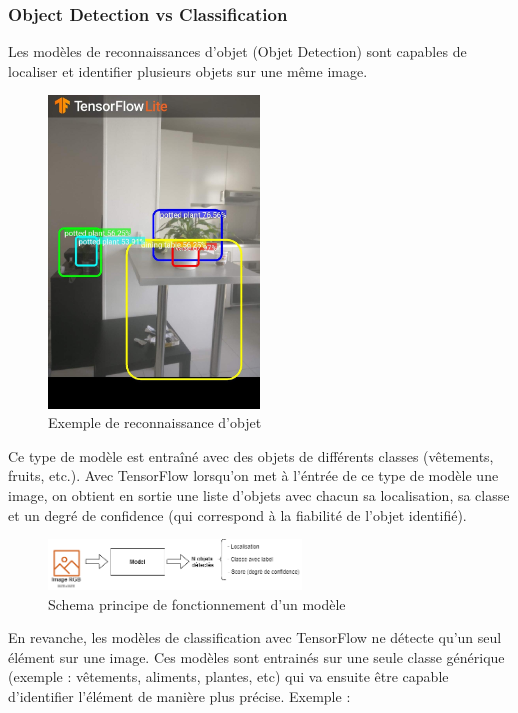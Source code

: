 \documentclass[UTF8]{EPURapport}
\begin{document}
\newpage

\subsubsection{Object Detection vs Classification}
Les modèles de reconnaissances d'objet (Objet Detection) sont capables de localiser et identifier plusieurs objets sur une même image.

\begin{figure}[h!]
\centering
  \includegraphics[width=0.5\textwidth]{images/object_detection.jpg}
  \caption{Exemple de reconnaissance d'objet}
  \label{fig:objectdetection}
\end{figure}

 Ce type de modèle est entraîné avec des objets de différents classes (vêtements, fruits, etc.). Avec TensorFlow lorsqu'on met à l'éntrée de ce type de modèle une image, on obtient en sortie une liste d'objets avec chacun sa localisation, sa classe et un degré de confidence (qui correspond à la fiabilité de l'objet identifié).

\begin{figure}[h!]
\centering
  \includegraphics[width=0.6\textwidth]{images/schema_objectDetection.png}
  \caption{Schema principe de fonctionnement d'un modèle}
  \label{fig:schema_objectdetection}
\end{figure}

En revanche, les modèles de classification avec TensorFlow ne détecte qu'un seul élément sur une image. Ces modèles sont entrainés sur une seule classe générique (exemple : vêtements, aliments, plantes, etc) qui va ensuite être capable d'identifier l'élément de manière plus précise. Exemple : \\
\end{document}
